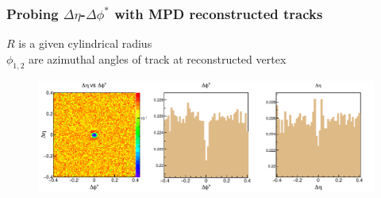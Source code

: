 \documentclass[dvipsnames] {beamer}
\begin{document}
         \begin{frame}[shrink]
        \frametitle{\bf \centering Probing $\Delta \eta$-$\Delta \phi^{*}$ with MPD reconstructed tracks}
        \bf
        \vskip -0.3cm
        \begin{block}{}
          $R$ is a given cylindrical radius \\
          $\phi_{1, 2}$ are azimuthal angles of track at reconstructed vertex
          
        \end{block}
        \begin{block}{}
           \begin{figure}[H]
             \includegraphics[width=1.\linewidth]{NICAdays_dEtadPhis.pdf}
           \end{figure}
        \end{block}
             
         \end{frame}
\end{document}
